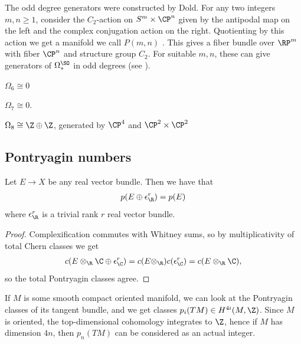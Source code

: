 \documentclass[11pt]{book}
\begin{document}
\begin{remark} The odd degree generators were constructed by Dold. For any two integers $m,n\ge1$, consider the $C_2$-action on $S^m \times \CP^n$ given by the antipodal map on the left and the complex conjugation action on the right. Quotienting by this action we get a manifold we call $P(m,n)$ \cite{doldErzeugendeThomschenAlgebra1956}. This gives a fiber bundle over $\RP^m$ with fiber $\CP^n$ and structure group $C_2$. For suitable $m,n$, these can give generators of $\Omega^\SO_\ast$ in odd degrees (see \cite[Satz~3]{doldErzeugendeThomschenAlgebra1956}).
\end{remark}

\begin{example} $\Omega_6\cong 0$
\end{example}

\begin{example}\label{exa:omega-so-7-is-zero} 
$\Omega_7\cong 0$.
\end{example}

\begin{example} $\Omega_8 \cong \Z \oplus \Z$, generated by $\CP^4$ and $\CP^2 \times \CP^2$
\end{example}

\subsection{Pontryagin numbers}

\begin{proposition}
\label{prop:pontryagin-classes-are-stable}
Let $E \to X$ be any real vector bundle. Then we have that
\begin{align*}
     p(E \oplus \epsilon_\R^r) = p(E)
\end{align*}
where $\epsilon_\R^r$ is a trivial rank $r$ real vector bundle.
\end{proposition}
\begin{proof} Complexification commutes with Whitney sums, so by multiplicativity of total Chern classes we get
\begin{align*}
    c(E \otimes_\R \C \oplus \epsilon_\C^r) = c(E \otimes_\R)c(\epsilon_\C^r) = c(E \otimes_\R \C),
\end{align*}
so the total Pontryagin classes agree.
\end{proof}

If $M$ is some smooth compact oriented manifold, we can look at the Pontryagin classes of its tangent bundle, and we get classes $p_i(TM) \in H^{4i}(M,\Z)$. Since $M$ is oriented, the top-dimensional cohomology integrates to $\Z$, hence if $M$ has dimension $4n$, then $p_n(TM)$ can be considered as an actual integer.
\end{document}
